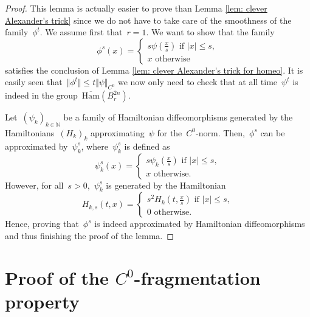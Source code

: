 \documentclass[10pt]{amsart}
\newcommand{\Ham}{\mathrm{Ham}}
\begin{document}
\begin{proof}
	This lemma is actually easier to prove than Lemma \ref{lem: clever Alexander's trick} since we do not have to take care of the smoothness of the family~$\phi^t$. We assume first that~$r=1$.
	We want to show that the family 
	$$\phi^s(x)=\begin{cases} s\psi(\frac{x}{s}) \text{ if } \vert x \vert \leq s,\\
		x \text{ otherwise}
	\end{cases}$$
	satisfies the conclusion of Lemma \ref{lem: clever Alexander's trick for homeo}. It is easily seen that~$\Vert\phi^t\Vert\leq t \Vert \psi \Vert_{C^0}$ we now only need to check that at all time~$\psi^t$ is indeed in the group~$\overline{\Ham}(B_r^{2n})$.
	
	Let~$(\psi_k)_{k\in \mathbb{N}}$ be a family of Hamiltonian diffeomorphisms generated by the Hamiltonians~$(H_k)_k$ approximating~$\psi$ for the~$C^0$-norm. Then,~$\phi^s$ can be approximated by~$\psi_k^s$, where~$\psi_k^s$ is defined as
	$$\psi_k^s(x)=\begin{cases}s \psi_k(\frac{x}{s}) \text{ if } \vert x \vert \leq s,\\
		x \text{ otherwise.}
	\end{cases}$$
	However, for all~$s>0$,~$\psi_k^s$ is generated by the Hamiltonian
	$$ H_{k,s}(t,x)=\begin{cases} s^2 H_k(t,\frac{x}{s}) \text{ if } \vert x \vert \leq s,\\
	0 \text{ otherwise.}
	\end{cases}$$
	Hence, proving that~$\phi^s$ is indeed approximated by Hamiltonian diffeomorphisms and thus finishing the proof of the lemma.
\end{proof}



\section{Proof of the $C^0$-fragmentation property}\label{sec: pf of the frag prop}
\end{document}
